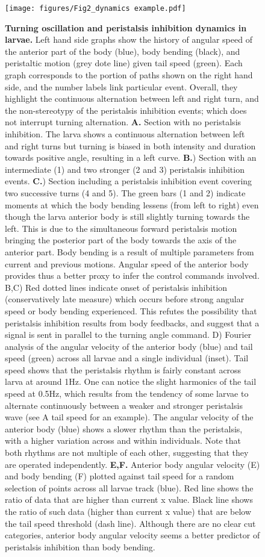 \documentclass[10pt,a4paper]{article}
\begin{document}
\begin{figure}[!ht]
\begin{center}
\texttt{[image: figures/Fig2\_dynamics example.pdf]}
\caption{{\bf Turning oscillation and peristalsis inhibition dynamics in larvae.} 
Left hand side graphs show the history of angular speed of the anterior part of the body (blue), body bending (black), and peristaltic motion (grey dote line) given tail speed (green). Each graph corresponds to the portion of paths shown on the right hand side, and the number labels link particular event. Overall, they highlight the continuous alternation between left and right turn, and the non-stereotypy of the peristalsis inhibition events; which does not interrupt turning alternation.
{\bf A.} Section with no peristalsis inhibition. The larva shows a continuous alternation between left and right turns but turning is biased in both intensity and duration towards positive angle, resulting in a left curve.
{\bf B.}) Section with an intermediate (1) and two stronger (2 and 3) peristalsis inhibition events.
{\bf C.}) Section including a peristalsis inhibition event covering two successive turns (4 and 5). The green bars (1 and 2) indicate moments at which the body bending lessens (from left to right) even though the larva anterior body is still slightly turning towards the left. This is due to the simultaneous forward peristalsis motion bringing the posterior part of the body towards the axis of the anterior part. Body bending is a result of multiple parameters from current and previous motions. Angular speed of the anterior body provides thus a better proxy to infer the control commands involved. B,C) Red dotted lines indicate onset of peristalsis inhibition (conservatively late measure) which occurs before strong angular speed or body bending experienced. This refutes the possibility that peristalsis inhibition results from body feedbacks, and suggest that a signal is sent in parallel to the turning angle command. D) Fourier analysis of the angular velocity of the anterior body (blue) and tail speed (green) across all larvae and a single individual (inset). Tail speed shows that the peristalsis rhythm is fairly constant across larva at around 1Hz. One can notice the slight harmonics of the tail speed at 0.5Hz, which results from the tendency of some larvae to alternate continuously between a weaker and stronger peristalsis wave (see A tail speed for an example). The angular velocity of the anterior body (blue) shows a slower rhythm than the peristalsis, with a higher variation across and within individuals. Note that both rhythms are not multiple of each other, suggesting that they are operated independently.
{\bf  E,F.} Anterior body angular velocity (E) and body bending (F) plotted against tail speed for a random selection of points across all larvae track (blue). Red line shows the ratio of data that are higher than current x value. Black line shows the ratio of such data (higher than current x value) that are below the tail speed threshold (dash line). Although there are no clear cut categories, anterior body angular velocity seems a better predictor of peristalsis inhibition than body bending.
\label{fig:Fig2}}
\end{center}
\end{figure}
\end{document}
